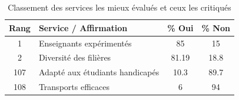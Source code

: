\documentclass[
12pt,          %
a4paper,       %
oneside,      %
openright      %
]{report}          %
\begin{document}
\chapter{}
\label{ann:resume}
\begin{table}[H]
	\centering
	\caption{Classement des services les mieux évalués et ceux les critiqués}
	\label{tab:coefficients}
	
	\begin{tabular}{clcc}
		\toprule
		\rowcolor{couleurPrimaire!20}
		\textbf{Rang} & \textbf{Service / Affirmation} & \textbf{\% Oui} & \textbf{\% Non} \\
		\midrule
		1 & Enseignants expérimentés & 85 & 15 \\
		2 & Diversité des filières & 81.19 & 18.8 \\
		107 & Adapté aux étudiants handicapés & 10.3 & 89.7 \\
		108 & Transports efficaces & 6 & 94 \\
		\bottomrule
	\end{tabular}
	
\end{table}

		
		
\end{document}
